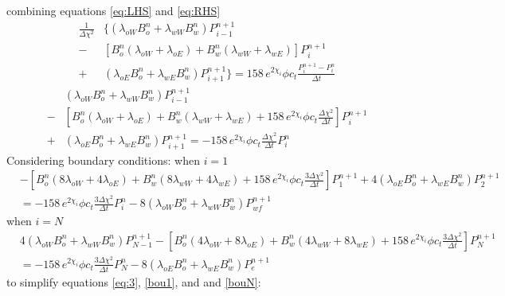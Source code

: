 \documentclass[12pt,letterpaper,titlepage]{article}
\begin{document}
combining equations \ref{eq:LHS} and \ref{eq:RHS}
\begin{equation*}
\begin{aligned}
\frac{1}{\Delta\chi^2}& \Bigg\{(\lambda_{oW}B_o^n+\lambda_{wW}B_w^n)P_{i-1}^{n+1}\\-&\left[B_o^n(\lambda_{oW}+\lambda_{oE})+B_w^n(\lambda_{wW}+\lambda_{wE})\right]P_i^{n+1}\\+&(\lambda_{oE}B_o^n+\lambda_{wE}B_w^n)P_{i+1}^{n+1}\Bigg\} = 158\,e^{2\chi_i}\phi c_t \frac{P_i^{n+1}-P_i^n}{\Delta t}
\end{aligned}
\end{equation*}
\begin{equation}
\label{eq:3}
\begin{aligned}
& (\lambda_{oW}B_o^n+\lambda_{wW}B_w^n)P_{i-1}^{n+1}\\-&\left[B_o^n(\lambda_{oW}+\lambda_{oE})+B_w^n(\lambda_{wW}+\lambda_{wE})+158\,e^{2\chi_i}\phi c_t \frac{\Delta\chi^2}{\Delta t}\right]P_i^{n+1}\\+&(\lambda_{oE}B_o^n+\lambda_{wE}B_w^n)P_{i+1}^{n+1} = -158\,e^{2\chi_i}\phi c_t \frac{\Delta\chi^2}{\Delta t}P_i^n
\end{aligned}
\end{equation}
Considering boundary conditions:
when $i=1$
\begin{equation}
\label{bou1}
\begin{aligned}
&-\left[B_o^n(8\lambda_{oW}+4\lambda_{oE})+B_w^n(8\lambda_{wW}+4\lambda_{wE})+158\,e^{2\chi_i}\phi c_t \frac{3\Delta\chi^2}{\Delta t}\right]P_1^{n+1}+ 4(\lambda_{oE}B_o^n+\lambda_{wE}B_w^n)P_{2}^{n+1} \\&= -158\,e^{2\chi_i}\phi c_t \frac{3\Delta\chi^2}{\Delta t}P_i^n-8(\lambda_{oW}B_o^n+\lambda_{wW}B_w^n)P_{wf}^{n+1}
\end{aligned}
\end{equation}
when $i=N$
\begin{equation}
\label{bouN}
\begin{aligned}
&4(\lambda_{oW}B_o^n+\lambda_{wW}B_w^n)P_{N-1}^{n+1}-\left[B_o^n(4\lambda_{oW}+8\lambda_{oE})+B_w^n(4\lambda_{wW}+8\lambda_{wE})+158\,e^{2\chi_i}\phi c_t \frac{3\Delta\chi^2}{\Delta t}\right]P_N^{n+1} \\&= -158\,e^{2\chi_i}\phi c_t \frac{3\Delta\chi^2}{\Delta t}P_N^n- 8(\lambda_{oE}B_o^n+\lambda_{wE}B_w^n)P_{e}^{n+1}
\end{aligned}
\end{equation}
to simplify equations \ref{eq:3}, \ref{bou1}, and and \ref{bouN}:\\
\end{document}
